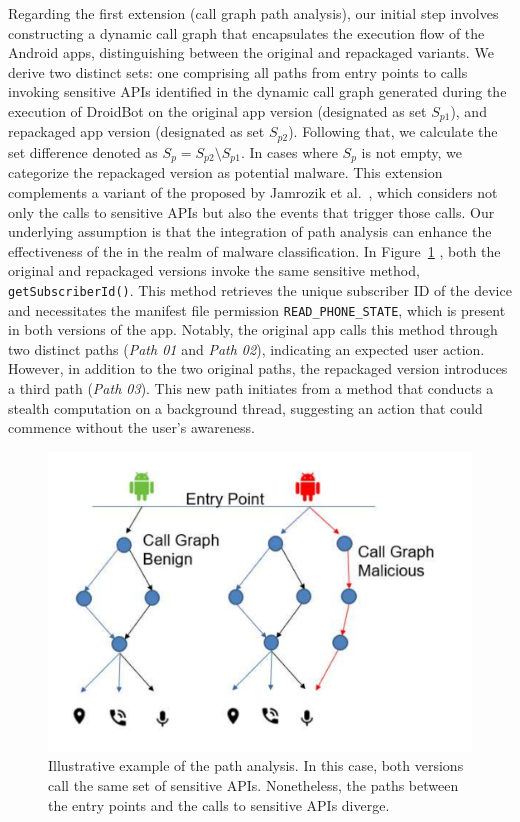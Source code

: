 Regarding the first extension (call graph path analysis), our initial step involves constructing a
dynamic call graph that encapsulates the execution flow of the Android apps,
distinguishing between the original and repackaged variants. We derive two distinct sets:
one comprising all paths from entry points to calls invoking sensitive APIs identified in the dynamic call graph generated during the execution of
DroidBot on the original app version (designated as set $S_{p1}$), and repackaged app version (designated as set $S_{p2}$).
Following that, we calculate the set difference denoted as $S_p = S_{p2} \setminus S_{p1}$.
In cases where $S_p$ is not empty, we categorize the repackaged version as potential malware.
This extension complements a variant of the \mas proposed by Jamrozik et al.~\cite{DBLP:conf/icse/JamrozikSZ16},
which considers not only the calls to sensitive APIs but also the events that trigger those calls.
Our underlying assumption is that the integration of path analysis can enhance the effectiveness of
the \mas in the realm of malware classification.
In Figure~\ref{fig:callGraph} , both the original and repackaged
versions invoke the same sensitive method, \texttt{getSubscriberId()}.
This method retrieves the unique subscriber ID of the device and necessitates the manifest file
permission \texttt{READ\_PHONE\_STATE}, which is present in both versions of the app.
Notably, the original app calls this method through two distinct paths (\emph{Path 01} and \emph{Path 02}),
indicating an expected user action. However, in addition to the two original paths,
the repackaged version introduces a third path (\emph{Path 03}). This new path initiates
from a method that conducts a stealth computation on a background thread, suggesting an action that could
commence without the user's awareness.


\begin{figure}[ht]
\centering
\includegraphics[scale=0.30]{images/maliciousCallGraph.pdf}
\caption{Illustrative example of the path analysis. In this case, both versions call the same set of sensitive APIs. Nonetheless,
the paths between the entry points and the calls to sensitive APIs diverge.}
 \label{fig:callGraph}
\end{figure}

